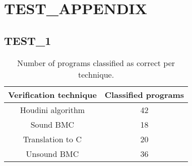 \chapter{TEST\_APPENDIX}
\section{TEST\_1}

\begin{table}[!h]
	\centering
	\begin{tabular}{|c|c|}
		\hline
		\textbf{Verification technique} & \textbf{Classified programs} \\ \hline
		Houdini algorithm & 42 \\\hline
		Sound BMC & 18 \\\hline
		Translation to C & 20 \\\hline
		Unsound BMC & 36 \\\hline
	\end{tabular}
	\caption{Number of programs classified as correct per technique.}
	\label{tab:classified_programs_appendix}
\end{table}